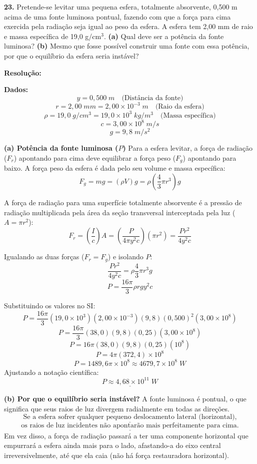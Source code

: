 \documentclass[12pt,a4paper]{article}
\begin{document}
\textbf{23. }\normalfont Pretende-se levitar uma pequena esfera, totalmente absorvente, 0,500 m acima de uma fonte luminosa pontual, fazendo com que a força para cima exercida pela radiação seja igual ao peso da esfera. A esfera tem 2,00 mm de raio e massa específica de 19,0 g/cm$^3$. \textbf{(a)} Qual deve ser a potência da fonte luminosa? \textbf{(b)} Mesmo que fosse possível construir uma fonte com essa potência, por que o equilíbrio da esfera seria instável?

\textbf{Resolução:}
\vspace{0.3cm}

\textbf{Dados:}
\[y = 0,500\;m \quad \text{(Distância da fonte)}\]
\[r = 2,00\;mm = 2,00 \times 10^{-3}\;m \quad \text{(Raio da esfera)}\]
\[\rho = 19,0\;g/cm^3 = 19,0 \times 10^3\;kg/m^3 \quad \text{(Massa específica)}\]
\[c = 3,00 \times 10^8\;m/s\]
\[g = 9,8\;m/s^2\]

\vspace{0.2cm}
\textbf{(a) Potência da fonte luminosa (\(P\))}
Para a esfera levitar, a força de radiação (\(F_r\)) apontando para cima deve equilibrar a força peso (\(F_g\)) apontando para baixo.
A força peso da esfera é dada pelo seu volume e massa específica:
\[F_g = mg = (\rho V)g = \rho \left( \frac{4}{3}\pi r^3 \right) g\]

A força de radiação para uma superfície totalmente absorvente é a pressão de radiação multiplicada pela área da seção transversal interceptada pela luz (\(A = \pi r^2\)):
\[F_r = \left( \frac{I}{c} \right) A = \left( \frac{P}{4\pi y^2 c} \right) (\pi r^2) = \frac{P r^2}{4 y^2 c}\]

Igualando as duas forças (\(F_r = F_g\)) e isolando \(P\):
\[\frac{P r^2}{4 y^2 c} = \rho \frac{4}{3}\pi r^3 g\]
\[P = \frac{16\pi}{3} \rho r g y^2 c\]

Substituindo os valores no SI:
\[P = \frac{16\pi}{3} (19,0 \times 10^3)(2,00 \times 10^{-3})(9,8)(0,500)^2(3,00 \times 10^8)\]
\[P = \frac{16\pi}{3} (38,0)(9,8)(0,25)(3,00 \times 10^8)\]
\[P = 16\pi (38,0)(9,8)(0,25)(10^8)\]
\[P = 4\pi (372,4) \times 10^8\]
\[P = 1489,6\pi \times 10^8 \approx 4679,7 \times 10^8\;W\]
Ajustando a notação científica:
\[\underline{P \approx 4,68 \times 10^{11}\;W}\]

\vspace{0.2cm}
\textbf{(b) Por que o equilíbrio seria instável?}
A fonte luminosa é pontual, o que significa que seus raios de luz divergem radialmente em todas as direções. 
\[\underline{\text{Se a esfera sofrer qualquer pequeno deslocamento lateral (horizontal),}}\]
\[\underline{\text{os raios de luz incidentes não apontarão mais perfeitamente para cima.}}\]
Em vez disso, a força de radiação passará a ter uma componente horizontal que empurrará a esfera ainda mais para o lado, afastando-a do eixo central irreversivelmente, até que ela caia (não há força restauradora horizontal).
\end{document}
